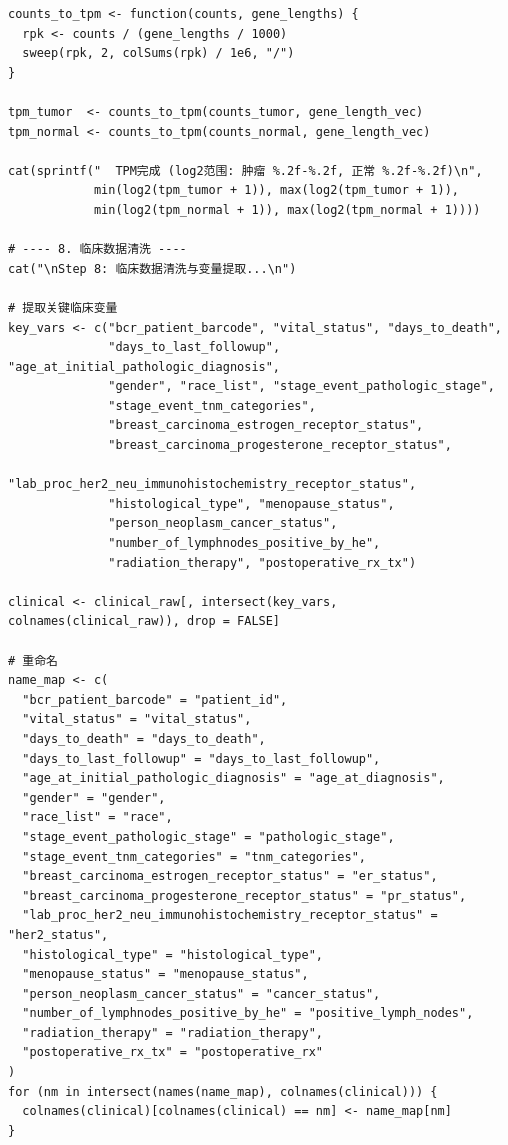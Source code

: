 \documentclass[12pt,a4paper]{ctexart}
\begin{document}
\begin{lstlisting}[caption={01_data_preprocessing}, basicstyle=\ttfamily\scriptsize]
counts_to_tpm <- function(counts, gene_lengths) {
  rpk <- counts / (gene_lengths / 1000)
  sweep(rpk, 2, colSums(rpk) / 1e6, "/")
}

tpm_tumor  <- counts_to_tpm(counts_tumor, gene_length_vec)
tpm_normal <- counts_to_tpm(counts_normal, gene_length_vec)

cat(sprintf("  TPM完成 (log2范围: 肿瘤 %.2f-%.2f, 正常 %.2f-%.2f)\n",
            min(log2(tpm_tumor + 1)), max(log2(tpm_tumor + 1)),
            min(log2(tpm_normal + 1)), max(log2(tpm_normal + 1))))

# ---- 8. 临床数据清洗 ----
cat("\nStep 8: 临床数据清洗与变量提取...\n")

# 提取关键临床变量
key_vars <- c("bcr_patient_barcode", "vital_status", "days_to_death",
              "days_to_last_followup", "age_at_initial_pathologic_diagnosis",
              "gender", "race_list", "stage_event_pathologic_stage",
              "stage_event_tnm_categories",
              "breast_carcinoma_estrogen_receptor_status",
              "breast_carcinoma_progesterone_receptor_status",
              "lab_proc_her2_neu_immunohistochemistry_receptor_status",
              "histological_type", "menopause_status",
              "person_neoplasm_cancer_status",
              "number_of_lymphnodes_positive_by_he",
              "radiation_therapy", "postoperative_rx_tx")

clinical <- clinical_raw[, intersect(key_vars, colnames(clinical_raw)), drop = FALSE]

# 重命名
name_map <- c(
  "bcr_patient_barcode" = "patient_id",
  "vital_status" = "vital_status",
  "days_to_death" = "days_to_death",
  "days_to_last_followup" = "days_to_last_followup",
  "age_at_initial_pathologic_diagnosis" = "age_at_diagnosis",
  "gender" = "gender",
  "race_list" = "race",
  "stage_event_pathologic_stage" = "pathologic_stage",
  "stage_event_tnm_categories" = "tnm_categories",
  "breast_carcinoma_estrogen_receptor_status" = "er_status",
  "breast_carcinoma_progesterone_receptor_status" = "pr_status",
  "lab_proc_her2_neu_immunohistochemistry_receptor_status" = "her2_status",
  "histological_type" = "histological_type",
  "menopause_status" = "menopause_status",
  "person_neoplasm_cancer_status" = "cancer_status",
  "number_of_lymphnodes_positive_by_he" = "positive_lymph_nodes",
  "radiation_therapy" = "radiation_therapy",
  "postoperative_rx_tx" = "postoperative_rx"
)
for (nm in intersect(names(name_map), colnames(clinical))) {
  colnames(clinical)[colnames(clinical) == nm] <- name_map[nm]
}


\end{lstlisting}
\end{document}
